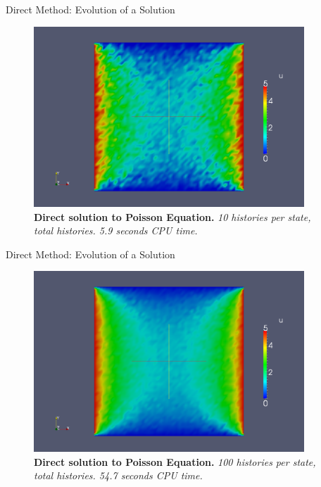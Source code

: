\documentclass{beamer}
\begin{document}
\begin{frame}{Direct Method: Evolution of a Solution}

  \begin{figure}[h!]
    \begin{center}
      \includegraphics[width=4in]{direct_10.png}
    \end{center}
    \caption{\textbf{Direct solution to Poisson Equation.} \textit{10
        histories per state,  total histories. 5.9 seconds
        CPU time.} }
  \end{figure}

\end{frame}

\begin{frame}{Direct Method: Evolution of a Solution}

  \begin{figure}[h!]
    \begin{center}
      \includegraphics[width=4in]{direct_100.png}
    \end{center}
    \caption{\textbf{Direct solution to Poisson Equation.}
      \textit{100 histories per state,  total
        histories. 54.7 seconds CPU time.} }
  \end{figure}

\end{frame}
\end{document}
